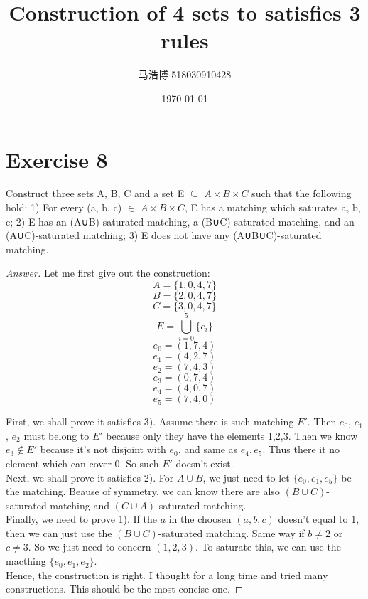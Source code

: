 \documentclass[12pt]{article}
\title{Construction of 4 sets to satisfies 3 rules}
\author{马浩博 518030910428}
\date{\today}
\theoremstyle{mythm}
\begin{document}
\maketitle

\section*{Exercise 8}
\begin{tcolorbox}
  Construct three sets A, B, C and a set E $\subseteq$ $A \times B \times C$ 
  such that the following hold: 1) For every (a, b, c) $\in$ $A \times B \times C$, E has a matching which saturates {a, b, c}; 
  2) E has an (A∪B)-saturated matching, a (B∪C)-saturated matching, and an (A∪C)-saturated matching; 3) E does not have any (A∪B∪C)-saturated matching.

\end{tcolorbox}

\begin{proof}[Answer]

  Let me first give out the construction:
  $$A = \{1, 0, 4, 7 \}$$
  $$B = \{2, 0, 4, 7 \}$$
  $$C = \{3, 0, 4, 7 \}$$
  $$E = \bigcup\limits_{i=0}^5 \{e_i\}$$
  $$e_0 = (1,7,4)$$
  $$e_1 = (4,2,7)$$
  $$e_2 = (7,4,3)$$
  $$e_3 = (0,7,4)$$
  $$e_4 = (4,0,7)$$
  $$e_5 = (7,4,0)$$



  First, we shall prove it satisfies 3). Assume there is such matching $E'$. 
  Then $e_0$, $e_1$, $e_2$ must belong to $E'$ because only they have the elements 1,2,3. 
  Then we know $e_3 \notin E'$ because it's not disjoint with $e_0$, and same as $e_4, e_5$. 
  Thus there it no element which can cover 0. So such $E'$ doesn't exist.\\

  Next, we shall prove it satisfies 2). For $A \cup B$, we just need to let $\{e_0,e_1,e_5\}$ be the matching. 
  Beause of symmetry, we can know there are also $(B \cup C)$-saturated matching and $(C \cup A)$-saturated matching.\\

  Finally, we need to prove 1). If the $a$ in the choosen $(a,b,c)$ doesn't equal to 1, then we can just use the $(B \cup C)$-saturated matching.
  Same way if $b \neq 2$ or $c \neq 3$. So we just need to concern $(1,2,3)$. 
  To saturate this, we can use the macthing $\{e_0,e_1,e_2\}$.\\

  Hence, the construction is right. I thought for a long time and tried many constructions. 
  This should be the most concise one.

\end{proof}
\end{document}

